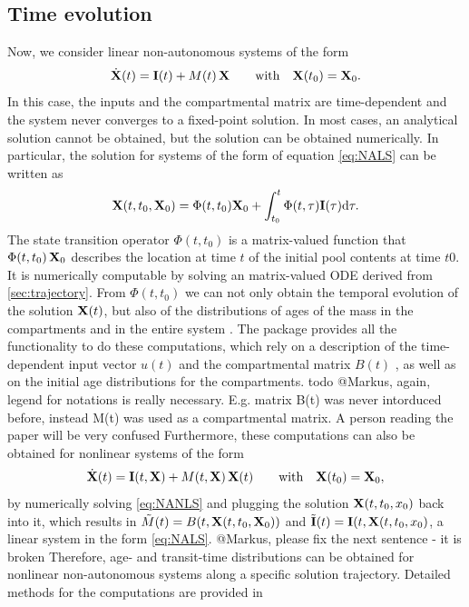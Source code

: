 \subsection{Time evolution} \label{sec:trajectory}
Now, we consider linear non-autonomous systems of the form
\begin{equation} \label{eq:NALS}
\dot{\mathbf{X}}(t) = \mathbf{I}(t) + M(t) \, \mathbf{X} \qquad  \mathrm{with} \quad \mathbf{X}(t_0) = \mathbf{X}_0.
\end{equation}
In this case, the inputs and the compartmental matrix are time-dependent and
the system never converges to a fixed-point solution. In most cases, an
analytical solution cannot be obtained, but the solution can be 
obtained numerically. In particular, the solution for systems of the form of equation \eqref{eq:NALS} can be written as
\begin{equation}
\mathbf{X}(t, t_0, \mathbf{X}_0) = \Phi(t, t_0) \mathbf{X}_0 + \int_{t_0}^{t} \Phi(t, \tau) \mathbf{I}(\tau) \mathrm{d}\tau.
  \label{eqn:Phi}
\end{equation}
The state transition operator $\Phi(t,t_0)$ is a matrix-valued function that $\Phi(t, t_0)\,\mathbf{X}_0$ describes the location at time $t$ of the initial pool contents at time $t0$.
It is numerically computable by solving an matrix-valued
ODE derived from \eqref{sec:trajectory}.
From $\Phi(t,t_0)$ we can not only obtain the temporal evolution of the
solution $\mathbf{X}(t)$, but also of the distributions of ages of the mass in the compartments and in the entire system \citep{Metzler2018PNAS}.
The \CompartmentalSystems{} package provides all the functionality to do these computations, which rely on a description of the time-dependent input vector $u(t)$  and the compartmental matrix $B(t)$ , as well as on the initial age distributions for the compartments.
{todo @Markus, again, legend for notations is really necessary. E.g. matrix B(t) was never intorduced before, instead M(t) was used as a compartmental matrix. A person reading the paper will be very confused}
Furthermore, these computations can also be obtained for nonlinear systems of the form
\begin{equation} \label{eq:NANLS}
\dot{\mathbf{X}}(t) = \mathbf{I}(t, \mathbf{X}) + M(t, \mathbf{X}) \, \mathbf{X}(t) \qquad  \mathrm{with} \quad \mathbf{X}(t_0) = \mathbf{X}_0,
\end{equation}
by numerically solving \eqref{eq:NANLS} and plugging the solution $\mathbf{X}(t, t_0,
x_0)$ back into it, which results in $\tilde{M}(t)=B(t, \mathbf{X}(t, t_0,\mathbf{X}_0))$  and
$\tilde{\mathbf{I}}(t)=\mathbf{I}(t,\mathbf{X}(t, t_0,x_0)$, \ie a linear system in the form
\eqref{eq:NALS}. 
{@Markus, please fix the next sentence - it is broken}
Therefore,  age- and transit-time
distributions can be obtained for nonlinear non-autonomous systems along a
specific solution trajectory. Detailed methods for the computations are provided in
\cite{Metzler2018PNAS}

